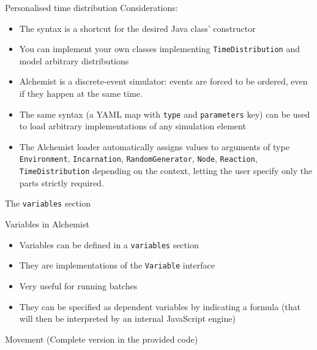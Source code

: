 \documentclass[presentation]{beamer}
\begin{document}
\begin{frame}[fragile]{Personalised time distribution}
	Considerations:
	\begin{itemize}
		\item The syntax is a shortcut for the desired Java class' constructor
		\item You can implement your own classes implementing \texttt{TimeDistribution} and model arbitrary distributions
		\item Alchemist is a discrete-event simulator: events are forced to be ordered, even if they happen at the same time.
		\item The same syntax (a YAML map with \texttt{type} and \texttt{parameters} key) can be used to load arbitrary implementations of any simulation element
		\item The Alchemist loader automatically assigns values to arguments of type \texttt{Environment},
        \texttt{Incarnation},
        \texttt{RandomGenerator},
        \texttt{Node},
        \texttt{Reaction},
        \texttt{TimeDistribution} depending on the context,
        letting the user specify only the parts strictly required.
	\end{itemize}
\end{frame}

\begin{frame}[fragile]{The \texttt{variables} section}
\end{frame}

\begin{frame}[fragile]{Variables in Alchemist}
	\begin{itemize}
	  \item Variables can be defined in a \texttt{variables} section
	  \item They are implementations of the \texttt{Variable} interface
	  \item Very useful for running batches
	  \item They can be specified as dependent variables by indicating a formula (that will then be interpreted by an internal JavaScript engine)
	\end{itemize}
\end{frame}


\begin{frame}[fragile]{Movement}
	(Complete version in the provided code)
\end{frame}
\end{document}
